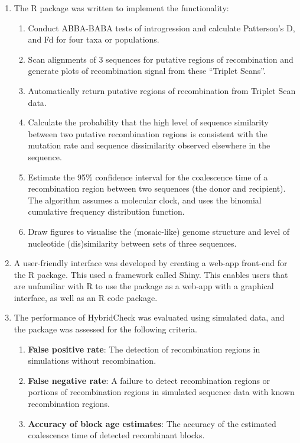 \begin{enumerate}
	\item The R package was written to implement the functionality:
    \begin{enumerate}
    	\item Conduct ABBA-BABA tests of introgression and calculate Patterson’s D, and Fd for four taxa or populations.
        \item Scan alignments of 3 sequences for putative regions of recombination and generate plots of recombination signal from these “Triplet Scans”.
        \item Automatically return putative regions of recombination from Triplet Scan data.
        \item Calculate the probability that the high level of sequence similarity between two putative recombination regions is consistent with the mutation rate and sequence dissimilarity observed elsewhere in the sequence.
        \item Estimate the 95\% confidence interval for the coalescence time of a recombination region between two sequences (the donor and recipient). The algorithm assumes a molecular clock, and uses the binomial cumulative frequency distribution function.
        \item Draw figures to visualise the (mosaic-like) genome structure and level of nucleotide (dis)similarity between sets of three sequences.
    \end{enumerate}
    \item A user-friendly interface was developed by creating a web-app front-end for the R package. This used a framework called Shiny. This enables users that are unfamiliar with R to use the package as a web-app with a graphical interface, as well as an R code package.
    \item The performance of HybridCheck was evaluated using simulated data, and the package was assessed for the following criteria.
    \begin{enumerate}
		\item \textbf{False positive rate}: The detection of recombination regions in simulations without recombination.
        \item \textbf{False negative rate}: A failure to detect recombination regions or portions of recombination regions in simulated sequence data with known recombination regions.
        \item \textbf{Accuracy of block age estimates}: The accuracy of the estimated coalescence time of detected recombinant blocks.
	\end{enumerate}
\end{enumerate}


